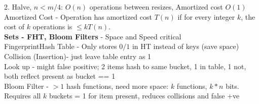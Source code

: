 \documentclass[10pt, a4paper]{article}
\begin{document}
\begin{multicols*}{3}
		2. Halve, $n < m/4$: $O(n)$ operations between resizes, Amortized cost $O(1)$\\
		Amortized Cost - Operation has amortized cost $T(n)$ if for every integer $k$, the cost of $k$ operations is $\leq kT(n)$.\\
		\textbf{Sets - FHT, Bloom Filters} - Space and Speed critical\\
		FingerprintHash Table - Only stores $0 / 1$ in HT instead of keys (save space)\\
		Collision (Insertion)- just leave table entry as 1\\
		Look up - might false positive; 2 items hash to same bucket, 1 in table, 1 not, both reflect present as bucket == 1\\
		Bloom Filter - $> 1$ hash functions, need more space: $k$ functions, $k * n$ bits.\\
		Requires all $k$ buckets = 1 for item present, reduces collisions and false +ve\\
		

\end{multicols*}
\end{document}
